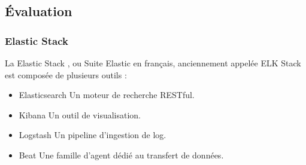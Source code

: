 \documentclass[paper=a4, fontsize=11pt]{scrartcl}
\begin{document}
\subsection{Évaluation}
\subsubsection{Elastic Stack}
La \og Elastic Stack \fg, ou \og Suite Elastic \fg en français, anciennement appelée \og ELK Stack \fg est composée de plusieurs outils :
\begin{itemize}
    \item Elasticsearch
    \subitem Un moteur de recherche RESTful.
    \item Kibana
    \subitem Un outil de visualisation.
    \item Logstash
    \subitem Un pipeline d'ingestion de log.
    \item Beat
    \subitem Une famille d'agent dédié au transfert de données.
\end{itemize}
\end{document}
